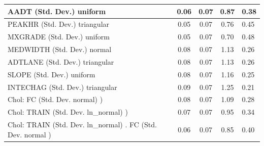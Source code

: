 \begin{table}
\begin{center}
\begin{tabular}{|l|l|c|c|c|l|}
			\hline
			AADT (Std. Dev.) uniform &  & 0.06 & 0.07 & 0.87 & 0.38 \\
			\hline
			PEAKHR (Std. Dev.) triangular &  & 0.05 & 0.07 & 0.76 & 0.45 \\
			\hline
			MXGRADE (Std. Dev.) uniform &  & 0.05 & 0.07 & 0.70 & 0.48 \\
			\hline
			MEDWIDTH (Std. Dev.) normal &  & 0.08 & 0.07 & 1.13 & 0.26 \\
			\hline
			ADTLANE (Std. Dev.) triangular &  & 0.08 & 0.07 & 1.13 & 0.26 \\
			\hline
			SLOPE (Std. Dev.) uniform &  & 0.08 & 0.07 & 1.16 & 0.25 \\
			\hline
			INTECHAG (Std. Dev.) triangular &  & 0.09 & 0.07 & 1.25 & 0.21 \\
			\hline
			 Chol: FC (Std. Dev. normal) ) &  & 0.08 & 0.07 & 1.09 & 0.28 \\
			\hline
			 Chol: TRAIN (Std. Dev. ln_normal) ) &  & 0.07 & 0.07 & 0.95 & 0.34 \\
			\hline
			 Chol: TRAIN (Std. Dev. ln_normal) . FC (Std. Dev.   normal ) &  & 0.06 & 0.07 & 0.85 & 0.40 \\
			\hline
		\end{tabular}
	\end{center}
\end{table}